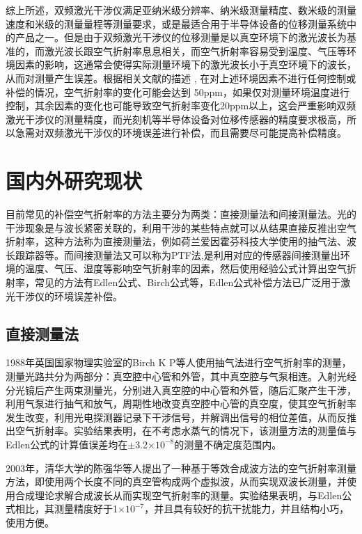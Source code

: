 综上所述，双频激光干涉仪满足亚纳米级分辨率、纳米级测量精度、数米级的测量速度和米级的测量量程等测量要求，或是最适合用于半导体设备的位移测量系统中的产品之一。但是由于双频激光干涉仪的位移测量是以真空环境下的激光波长为基准的，而激光波长跟空气折射率息息相关，而空气折射率容易受到温度、气压等环境因素的影响，这通常会使得实际测量环境下的激光波长小于真空环境下的波长\cite{戴成睿硕士论文面向激光追踪测量系统的空气折射率补偿方法研究}，从而对测量产生误差。根据相关文献的描述\cite{徐建2013双频激光干涉仪系统线性测量误差主要来源及减小误差的方法分析} , 在对上述环境因素不进行任何控制或补偿的情况，空气折射率的变化可能会达到 50ppm，如果仅对测量环境温度进行控制，其余因素的变化也可能导致空气折射率变化20ppm以上，这会严重影响双频激光干涉仪的测量精度，而光刻机等半导体设备对位移传感器的精度要求极高，所以急需对双频激光干涉仪的环境误差进行补偿，而且需要尽可能提高补偿精度。



\section{国内外研究现状}
目前常见的补偿空气折射率的方法主要分为两类：直接测量法和间接测量法。光的干涉现象是与波长紧密关联的，利用干涉的某些特点就可以从结果直接反推出空气折射率，这种方法称为直接测量法，例如荷兰爱因霍芬科技大学使用的抽气法、波长跟踪器等。而间接测量法又可以称为PTF法\cite{高精度空气折射率测量系统设计与实现},是利用对应的传感器间接测量出环境的温度、气压、湿度等影响空气折射率的因素，然后使用经验公式计算出空气折射率，常见的方法有Edlen公式、Birch公式等，Edlen公式补偿方法已广泛用于激光干涉仪的环境误差补偿。

\subsection{直接测量法}
1988年英国国家物理实验室的Birch K P等人使用抽气法进行空气折射率的测量，测量光路共分为两部分：真空腔中心管和外管，其中真空腔与气泵相连。入射光经分光镜后产生两束测量光，分别进入真空腔的中心管和外管，随后汇聚产生干涉，利用气泵进行抽气和放气，周期性地改变真空腔中心管的真空度，使其空气折射率发生改变，利用光电探测器记录下干涉信号，并解调出信号的相位差值，从而反推出空气折射率。实验结果表明，在不考虑水蒸气的情况下，该测量方法的测量值与Edlen公式的计算值误差均在$\pm$3.2$\times 10^{-8}$的测量不确定度范围内\cite{1988The}。

2003年，清华大学的陈强华等人提出了一种基于等效合成波方法的空气折射率测量方法，即使用两个长度不同的真空管构成两个虚拟波，从而实现双波长测量，并使用合成理论求解合成波长从而实现空气折射率的测量\cite{2004基于等效合成波方法的双真空管空气折射率测量仪}。实验结果表明，与Edlen公式相比，其测量精度好于1$\times 10^{-7}$，并且具有较好的抗干扰能力，并且结构小巧，使用方便。

